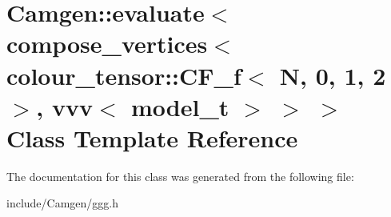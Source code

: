 \hypertarget{a00158}{}\section{Camgen\+:\+:evaluate$<$ compose\+\_\+vertices$<$ colour\+\_\+tensor\+:\+:C\+F\+\_\+f$<$ N, 0, 1, 2 $>$, vvv$<$ model\+\_\+t $>$ $>$ $>$ Class Template Reference}
\label{a00158}


The documentation for this class was generated from the following file\+:\begin{DoxyCompactItemize}
\item 
include/\+Camgen/ggg.\+h\end{DoxyCompactItemize}

